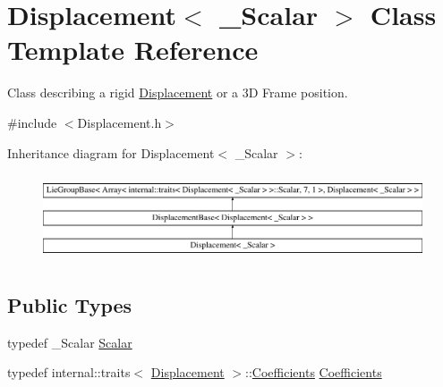 \hypertarget{class_displacement}{}\section{Displacement$<$ \+\_\+\+Scalar $>$ Class Template Reference}
\label{class_displacement}


Class describing a rigid \hyperlink{class_displacement}{Displacement} or a 3D Frame position.  




{\ttfamily \#include $<$Displacement.\+h$>$}

Inheritance diagram for Displacement$<$ \+\_\+\+Scalar $>$\+:\begin{figure}[H]
\begin{center}
\leavevmode
\includegraphics[height=2.584615cm]{class_displacement}
\end{center}
\end{figure}
\subsection*{Public Types}
\begin{DoxyCompactItemize}
\item 
typedef \+\_\+\+Scalar \hyperlink{class_displacement_ade979a89a65e3b67dea322a0cef92c88}{Scalar}
\item 
typedef internal\+::traits$<$ \hyperlink{class_displacement}{Displacement} $>$\+::\hyperlink{class_displacement_a995adefd20afdb476cdef2aa7bbc4531}{Coefficients} \hyperlink{class_displacement_a995adefd20afdb476cdef2aa7bbc4531}{Coefficients}
\end{DoxyCompactItemize}
